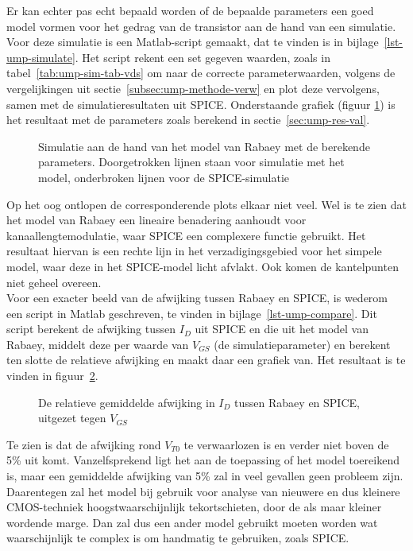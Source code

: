 \documentclass{scrartcl}
\begin{document}
Er kan echter pas echt bepaald worden of de bepaalde parameters een goed model vormen voor het gedrag van de transistor aan de hand van een simulatie. Voor deze simulatie is een Matlab-script gemaakt, dat te vinden is in bijlage~\ref{lst-ump-simulate}. Het script rekent een set gegeven waarden, zoals in tabel~\ref{tab:ump-sim-tab-vds} om naar de correcte parameterwaarden, volgens de vergelijkingen uit sectie~\ref{subsec:ump-methode-verw} en plot deze vervolgens, samen met de simulatieresultaten uit SPICE. Onderstaande grafiek (figuur \ref{fig:ump-sim-fig-vds-rab}) is het resultaat met de parameters zoals berekend in sectie~\ref{sec:ump-res-val}.

\begin{figure}[H]
	\centering
	\setlength{} 
	\setlength{}
	
	\caption{Simulatie aan de hand van het model van Rabaey met de berekende parameters. Doorgetrokken lijnen staan voor simulatie met het model, onderbroken lijnen voor de SPICE-simulatie}
	\label{fig:ump-sim-fig-vds-rab}
\end{figure}

Op het oog ontlopen de corresponderende plots elkaar niet veel. Wel is te zien dat het model van Rabaey een lineaire benadering aanhoudt voor kanaallengtemodulatie, waar SPICE een complexere functie gebruikt. Het resultaat hiervan is een rechte lijn in het verzadigingsgebied voor het simpele model, waar deze in het SPICE-model licht afvlakt. Ook komen de kantelpunten niet geheel overeen. \\

Voor een exacter beeld van de afwijking tussen Rabaey en SPICE, is wederom een script in Matlab geschreven, te vinden in bijlage~\ref{lst-ump-compare}. Dit script berekent de afwijking tussen $I_{D}$ uit SPICE en die uit het model van Rabaey, middelt deze per waarde van $V_{GS}$ (de simulatieparameter) en berekent ten slotte de relatieve afwijking en maakt daar een grafiek van. Het resultaat is te vinden in figuur~\ref{fig:ump-sim-fig-vds-rel-dev}.

\begin{figure}[H]
	\centering
	\setlength{} 
	\setlength{}
	
	\caption{De relatieve gemiddelde afwijking in $I_{D}$ tussen Rabaey en SPICE, uitgezet tegen $V_{GS}$}
	\label{fig:ump-sim-fig-vds-rel-dev}
\end{figure}

Te zien is dat de afwijking rond $V_{T0}$ te verwaarlozen is en verder niet boven de 5\% uit komt. Vanzelfsprekend ligt het aan de toepassing of het model toereikend is, maar een gemiddelde afwijking van 5\% zal in veel gevallen geen probleem zijn. Daarentegen zal het model bij gebruik voor analyse van nieuwere en dus kleinere CMOS-techniek hoogstwaarschijnlijk tekortschieten, door de als maar kleiner wordende marge. Dan zal dus een ander model gebruikt moeten worden wat waarschijnlijk te complex is om handmatig te gebruiken, zoals SPICE.
\end{document}
